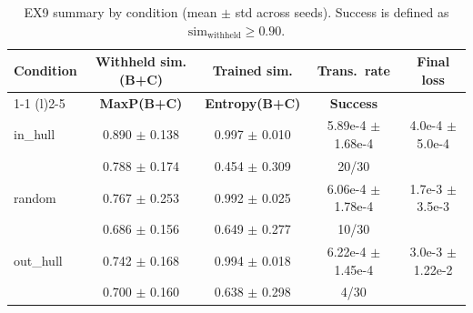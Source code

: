 \begin{table}[t]
\centering
\scriptsize %
\setlength{\tabcolsep}{3.0pt} %
\renewcommand{\arraystretch}{1.05}

\caption{EX9 summary by condition (mean $\pm$ std across seeds). Success is defined as $\mathrm{sim}_{\text{withheld}} \geq 0.90$.}
\label{tab:ex9_summary}

\begin{tabular*}{\linewidth}{@{\extracolsep{\fill}}l cccc}
\toprule
\textbf{Condition} & \textbf{Withheld sim. (B+C)} & \textbf{Trained sim.} & \textbf{Trans.\ rate} & \textbf{Final loss} \\
\cmidrule(r){1-1} \cmidrule(l){2-5}
\multicolumn{1}{l}{\textit{(N=30)}} & \textbf{MaxP(B+C)} & \textbf{Entropy(B+C)} & \textbf{Success} & \\
\midrule

in\_hull  & 0.890 $\pm$ 0.138 & 0.997 $\pm$ 0.010 & 5.89e-4 $\pm$ 1.68e-4 & 4.0e-4 $\pm$ 5.0e-4 \\
          & 0.788 $\pm$ 0.174 & 0.454 $\pm$ 0.309 & 20/30 & \\
\addlinespace

random    & 0.767 $\pm$ 0.253 & 0.992 $\pm$ 0.025 & 6.06e-4 $\pm$ 1.78e-4 & 1.7e-3 $\pm$ 3.5e-3 \\
          & 0.686 $\pm$ 0.156 & 0.649 $\pm$ 0.277 & 10/30 & \\
\addlinespace

out\_hull & 0.742 $\pm$ 0.168 & 0.994 $\pm$ 0.018 & 6.22e-4 $\pm$ 1.45e-4 & 3.0e-3 $\pm$ 1.22e-2 \\
          & 0.700 $\pm$ 0.160 & 0.638 $\pm$ 0.298 & 4/30 & \\

\bottomrule
\end{tabular*}
\end{table}